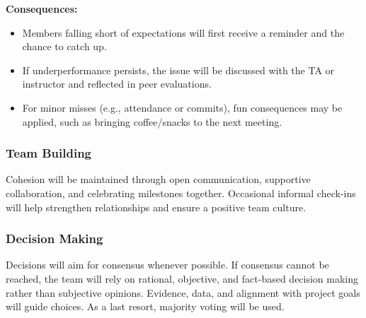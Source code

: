 \documentclass{article}
\begin{document}
\vspace{0.5em}
\noindent\textbf{Consequences:}
\begin{itemize}
    \item Members falling short of expectations will first receive a reminder and the chance to catch up.
    \item If underperformance persists, the issue will be discussed with the TA or instructor and reflected in peer evaluations.
    \item For minor misses (e.g., attendance or commits), fun consequences may be applied, such as bringing coffee/snacks to the next meeting.
\end{itemize}
\subsubsection*{Team Building}

Cohesion will be maintained through open communication, supportive collaboration, and celebrating milestones together. Occasional informal check-ins will help strengthen relationships and ensure a positive team culture.

\subsubsection*{Decision Making}

Decisions will aim for consensus whenever possible. If consensus cannot be reached, the team will rely on rational, objective, and fact-based decision making rather than subjective opinions. Evidence, data, and alignment with project goals will guide choices. As a last resort, majority voting will be used.
\end{document}
